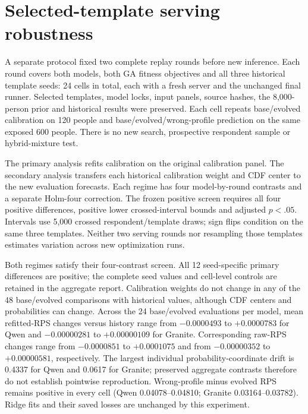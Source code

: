 \documentclass[10pt,twocolumn]{article}
\begin{document}
\section{Selected-template serving robustness}
A separate protocol fixed two complete replay rounds before new inference.
Each round covers both models, both GA fitness objectives and all three
historical template seeds: 24 cells in total, each with a fresh server and
the unchanged final runner. Selected templates, model locks, input panels,
source hashes, the 8,000-person prior and historical results were preserved.
Each cell repeats base/evolved calibration on 120 people and
base/evolved/wrong-profile prediction on the same exposed 600 people.
There is no new search, prospective respondent sample or hybrid-mixture test.

The primary analysis refits calibration on the original calibration panel.
The secondary analysis transfers each historical calibration weight and CDF
center to the new evaluation forecasts. Each regime has four model-by-round
contrasts and a separate Holm-four correction. The frozen positive screen
requires all four positive differences, positive lower crossed-interval bounds
and adjusted $p<.05$. Intervals use 5,000 crossed respondent/template draws;
sign flips condition on the same three templates. Neither two serving rounds
nor resampling those templates estimates variation across new optimization runs.



Both regimes satisfy their four-contrast screen. All 12 seed-specific primary
differences are positive; the complete seed values and cell-level controls
are retained in the aggregate report. Calibration weights do not change in
any of the 48 base/evolved comparisons with historical values, although CDF
centers and probabilities can change. Across the 24 base/evolved evaluations
per model, mean refitted-RPS changes versus history range from
$-0.0000493$ to $+0.0000783$ for Qwen and $-0.00000281$ to $+0.00000109$
for Granite. Corresponding raw-RPS changes range from $-0.0000851$ to
$+0.0001075$ and from $-0.00000352$ to $+0.00000581$, respectively.
The largest individual probability-coordinate drift is 0.4337 for Qwen and
0.0617 for Granite; preserved aggregate contrasts therefore do not establish
pointwise reproduction. Wrong-profile minus evolved RPS remains positive in
every cell (Qwen 0.04078--0.04810; Granite 0.03164--0.03782).
Ridge fits and their saved losses are unchanged by this experiment.
\end{document}
